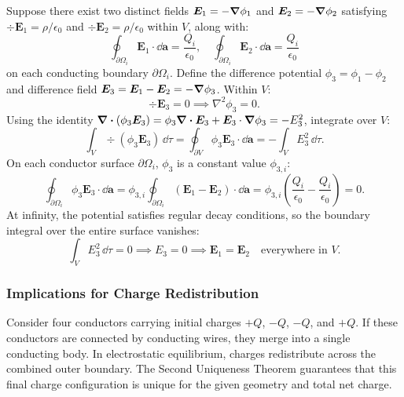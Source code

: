 \begin{proofbox}
    Suppose there exist two distinct fields \(\bm{E}_1 = -\grad\phi_1\) and \(\bm{E}_2 = -\grad\phi_2\) satisfying \(\div{\bm{E}_1} = \rho / \epsilon_0\) and \(\div{\bm{E}_2} = \rho / \epsilon_0\) within \(V\), along with:
    \begin{equation}
        \oint_{\partial\Omega_i} \bm{E}_1 \cdot \dd\bm{a} = \frac{Q_i}{\epsilon_0}, \quad \oint_{\partial\Omega_i} \bm{E}_2 \cdot \dd\bm{a} = \frac{Q_i}{\epsilon_0}
    \end{equation}
    on each conducting boundary \(\partial\Omega_i\). Define the difference potential \(\phi_3 = \phi_1 - \phi_2\) and difference field \(\bm{E}_3 = \bm{E}_1 - \bm{E}_2 = -\grad\phi_3\). Within \(V\):
    \begin{equation}
        \div{\bm{E}_3} = 0 \implies \nabla^2 \phi_3 = 0.
    \end{equation}
    Using the identity \(\div(\phi_3 \bm{E}_3) = \phi_3 \div{\bm{E}_3} + \bm{E}_3 \cdot \grad\phi_3 = -E_3^2\), integrate over \(V\):
    \begin{equation}
        \int_V \div(\phi_3 \bm{E}_3) \, \dd\tau = \oint_{\partial V} \phi_3 \bm{E}_3 \cdot \dd\bm{a} = -\int_V E_3^2 \, \dd\tau.
    \end{equation}
    On each conductor surface \(\partial\Omega_i\), \(\phi_3\) is a constant value \(\phi_{3, i}\):
    \begin{equation}
        \oint_{\partial\Omega_i} \phi_3 \bm{E}_3 \cdot \dd\bm{a} = \phi_{3, i} \oint_{\partial\Omega_i} (\bm{E}_1 - \bm{E}_2) \cdot \dd\bm{a} = \phi_{3, i} \left( \frac{Q_i}{\epsilon_0} - \frac{Q_i}{\epsilon_0} \right) = 0.
    \end{equation}
    At infinity, the potential satisfies regular decay conditions, so the boundary integral over the entire surface vanishes:
    \begin{equation}
        \int_V E_3^2 \, \dd\tau = 0 \implies E_3 = 0 \implies \bm{E}_1 = \bm{E}_2 \quad \text{everywhere in } V.
    \end{equation}
\end{proofbox}

\subsubsection{Implications for Charge Redistribution}

Consider four conductors carrying initial charges \(+Q\), \(-Q\), \(-Q\), and \(+Q\). If these conductors are connected by conducting wires, they merge into a single conducting body. In electrostatic equilibrium, charges redistribute across the combined outer boundary. The Second Uniqueness Theorem guarantees that this final charge configuration is unique for the given geometry and total net charge.


